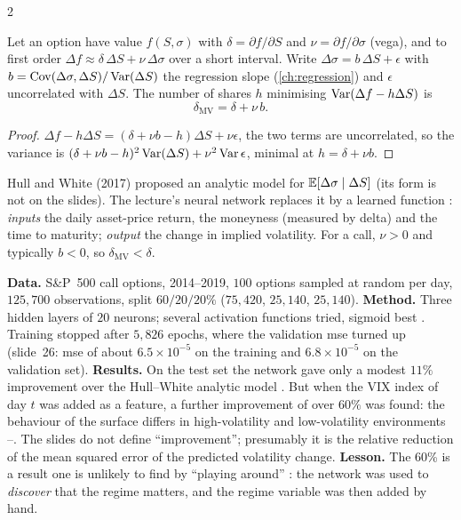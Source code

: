 \begin{paracol}{2}
\begin{proposition}\label{ch16:prop-mvdelta}
Let an option have value $f(S,\sigma)$ with $\delta=\partial f/\partial S$ and $\nu=\partial f/\partial\sigma$ (vega), and to first order $\Delta f\approx\delta\,\Delta S+\nu\,\Delta\sigma$ over a short interval. Write $\Delta\sigma=b\,\Delta S+\epsilon$ with
$b=\operatorname{Cov}(\Delta\sigma,\Delta S)/\operatorname{Var}(\Delta S)$ the regression slope (\cref{ch:regression}) and $\epsilon$ uncorrelated with $\Delta S$. The number of shares $h$ minimising $\operatorname{Var}(\Delta f-h\Delta S)$ is
\[
  \delta_{\mathrm{MV}}=\delta+\nu\,b .
\]
\end{proposition}
\begin{proof}
$\Delta f-h\Delta S=(\delta+\nu b-h)\Delta S+\nu\epsilon$, the two terms are uncorrelated, so the variance is $(\delta+\nu b-h)^2\operatorname{Var}(\Delta S)+\nu^2\operatorname{Var}\epsilon$, minimal at $h=\delta+\nu b$.
\end{proof}
Hull and White (2017) proposed an analytic model for $\mathbb{E}[\Delta\sigma\mid\Delta S]$ (its form is not on the slides). The lecture's neural network replaces it by a learned function
: \emph{inputs} the daily asset-price return, the moneyness (measured by delta) and the time to maturity; \emph{output} the change in implied volatility. For a call, $\nu>0$ and typically $b<0$, so $\delta_{\mathrm{MV}}<\delta$.

\begin{casestudy}
\textbf{Data.} S\&P~500 call options, 2014--2019, $100$ options sampled at random per day, $125{,}700$ observations, split $60/20/20\%$ ($75{,}420$, $25{,}140$, $25{,}140$).
\textbf{Method.} Three hidden layers of $20$ neurons; several activation functions tried, sigmoid best . Training stopped after $5{,}826$ epochs, where the validation mse turned up (slide~26: mse of about $6.5\times10^{-5}$ on the training and $6.8\times10^{-5}$ on the validation set).
\textbf{Results.} On the test set the network gave only a modest $11\%$ improvement over the Hull--White analytic model . But when the VIX index of day $t$ was added as a feature, a further improvement of over $60\%$ was found: the behaviour of the surface differs
in high-volatility and low-volatility environments --. The slides do not define ``improvement''; presumably it is the relative reduction of the mean squared error of the predicted volatility change.
\textbf{Lesson.} The 60\% is a result one is unlikely to find by ``playing around'' : the network was used to \emph{discover} that the regime matters, and the regime variable was then added by hand.
\end{casestudy}


\end{paracol}
